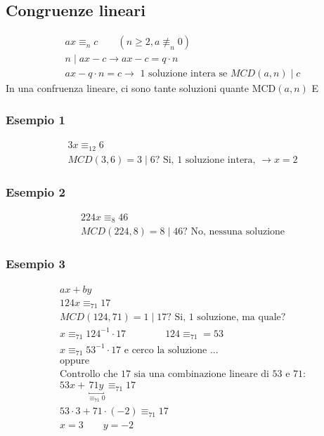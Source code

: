 \documentclass[italian]{article}
\newcommand{\mcd}[2]{\text{$\text{MCD}(#1, #2)$}}
\newcommand{\divides}[2]{\text{$#1 \;|\; #2$}}
\begin{document}
\subsection{Congruenze lineari}
\begin{gather*}
	ax \equiv_n c \qquad (n \geq 2, a \not\equiv_n 0)\\
	\divides{n}{ax-c} \to ax-c=q\cdot n\\
	ax - q\cdot n = c \to \text{ 1 soluzione intera se } MCD(a,n) \;|\; c	
\end{gather*}
In una confruenza lineare, ci sono tante soluzioni quante $\mcd{a}{n}$
E\subsubsection{Esempio 1}
\begin{gather*}
	3x \equiv_{12} 6 \\
	MCD(3,6)=\divides{3}{6} \text{? Si, 1 soluzione intera, } \to x=2  
\end{gather*}
\subsubsection{Esempio 2}
\begin{gather*}
	224x \equiv_8 46 \\
	MCD(224,8)=\divides{8}{46} \text{? No, nessuna soluzione} 
\end{gather*}
\subsubsection{Esempio 3}
\begin{gather*}
	ax + by \\
	124x \equiv_{71} 17\\
	MCD(124,71) = 1 \;|\; 17 \text{? Si, 1 soluzione, ma quale?}\\
	x \equiv_{71} 124^{-1}\cdot 17 \qquad\qquad 124\equiv_{71} = 53\\
	x \equiv_{71} 53^{-1}\cdot 17 \text{ e cerco la soluzione ...}\\
	\text{oppure}\\
	\text{Controllo che 17 sia una combinazione lineare di 53 e 71:}\\
	53x + \underbracket{71y}_{\equiv_{71} 0} \equiv_{71} 17	\\
	53\cdot 3 + 71\cdot(-2) \equiv_{71} 17 \\
	x=3 \qquad y=-2
\end{gather*}
\end{document}
